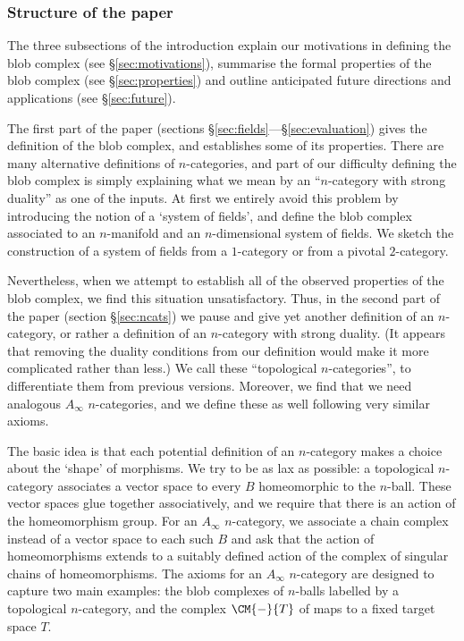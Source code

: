 \subsubsection{Structure of the paper}
The three subsections of the introduction explain our motivations in defining the blob complex (see \S \ref{sec:motivations}), summarise the formal properties of the blob complex (see \S \ref{sec:properties}) and outline anticipated future directions and applications (see \S \ref{sec:future}).

The first part of the paper (sections \S \ref{sec:fields}---\S \ref{sec:evaluation}) gives the definition of the blob complex, and establishes some of its properties. There are many alternative definitions of $n$-categories, and part of our difficulty defining the blob complex is simply explaining what we mean by an ``$n$-category with strong duality'' as one of the inputs. At first we entirely avoid this problem by introducing the notion of a `system of fields', and define the blob complex associated to an $n$-manifold and an $n$-dimensional system of fields. We sketch the construction of a system of fields from a $1$-category or from a pivotal $2$-category.

Nevertheless, when we attempt to establish all of the observed properties of the blob complex, we find this situation unsatisfactory. Thus, in the second part of the paper (section \S \ref{sec:ncats}) we pause and give yet another definition of an $n$-category, or rather a definition of an $n$-category with strong duality. (It appears that removing the duality conditions from our definition would make it more complicated rather than less.) We call these ``topological $n$-categories'', to differentiate them from previous versions. Moreover, we find that we need analogous $A_\infty$ $n$-categories, and we define these as well following very similar axioms.

The basic idea is that each potential definition of an $n$-category makes a choice about the `shape' of morphisms. We try to be as lax as possible: a topological $n$-category associates a vector space to every $B$ homeomorphic to the $n$-ball. These vector spaces glue together associatively, and we require that there is an action of the homeomorphism group.
For an $A_\infty$ $n$-category, we associate a chain complex instead of a vector space to each such $B$ and ask that the action of homeomorphisms extends to a suitably defined action of the complex of singular chains of homeomorphisms. The axioms for an $A_\infty$ $n$-category are designed to capture two main examples: the blob complexes of $n$-balls labelled by a topological $n$-category, and the complex $\CM{-}{T}$ of maps to a fixed target space $T$.

